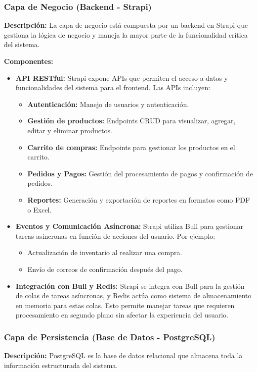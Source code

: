 \documentclass[12pt]{article}
\begin{document}
\begin{itemize}
    \subsubsection{Capa de Negocio (Backend - Strapi)}
    \textbf{Descripción:} La capa de negocio está compuesta por un backend en Strapi que gestiona la lógica de negocio y maneja la mayor parte de la funcionalidad crítica del sistema.

    \textbf{Componentes:}
    \begin{itemize}
        \item \textbf{API RESTful:} Strapi expone APIs que permiten el acceso a datos y funcionalidades del sistema para el frontend. Las APIs incluyen:
        \begin{itemize}
            \item \textbf{Autenticación:} Manejo de usuarios y autenticación.
            \item \textbf{Gestión de productos:} Endpoints CRUD para visualizar, agregar, editar y eliminar productos.
            \item \textbf{Carrito de compras:} Endpoints para gestionar los productos en el carrito.
            \item \textbf{Pedidos y Pagos:} Gestión del procesamiento de pagos y confirmación de pedidos.
            \item \textbf{Reportes:} Generación y exportación de reportes en formatos como PDF o Excel.
        \end{itemize}
        \item \textbf{Eventos y Comunicación Asíncrona:} Strapi utiliza Bull para gestionar tareas asíncronas en función de acciones del usuario. Por ejemplo:
        \begin{itemize}
            \item Actualización de inventario al realizar una compra.
            \item Envío de correos de confirmación después del pago.
        \end{itemize}
        \item \textbf{Integración con Bull y Redis:} Strapi se integra con Bull para la gestión de colas de tareas asíncronas, y Redis actúa como sistema de almacenamiento en memoria para estas colas. Esto permite manejar tareas que requieren procesamiento en segundo plano sin afectar la experiencia del usuario.
    \end{itemize}

    \subsubsection{Capa de Persistencia (Base de Datos - PostgreSQL)}
    \textbf{Descripción:} PostgreSQL es la base de datos relacional que almacena toda la información estructurada del sistema.


\end{itemize}
\end{document}
